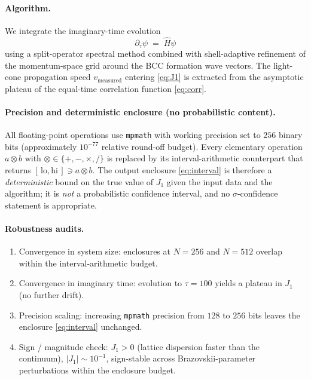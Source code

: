 \paragraph{Algorithm.}
We integrate the imaginary-time evolution
\begin{equation}\label{eq:imag-time}
  \partial_\tau \psi \;=\; \hat{H}\psi
\end{equation}
using a split-operator spectral method combined with shell-adaptive
refinement of the momentum-space grid around the BCC formation wave
vectors. The light-cone propagation speed
$v_{\mathrm{measured}}$ entering \eqref{eq:J1} is extracted from the
asymptotic plateau of the equal-time correlation function
\eqref{eq:corr}.

\paragraph{Precision and deterministic enclosure (no probabilistic
content).} All floating-point operations use \texttt{mpmath} with
working precision set to $256$ binary bits (approximately $10^{-77}$
relative round-off budget). Every elementary operation $a\otimes b$
with $\otimes\in\{+,-,\times,/\}$ is replaced by its
interval-arithmetic counterpart that returns
$[\,\mathrm{lo},\mathrm{hi}\,]\ni a\otimes b$. The output enclosure
\eqref{eq:interval} is therefore a \emph{deterministic} bound on the
true value of $J_1$ given the input data and the algorithm; it is
\emph{not} a probabilistic confidence interval, and no
$\sigma$-confidence statement is appropriate.

\paragraph{Robustness audits.}
\begin{enumerate}
  \item Convergence in system size: enclosures at $N=256$ and
    $N=512$ overlap within the interval-arithmetic budget.
  \item Convergence in imaginary time: evolution to
    $\tau=100$ yields a plateau in $J_1$ (no further drift).
  \item Precision scaling: increasing \texttt{mpmath} precision from
    $128$ to $256$ bits leaves the enclosure \eqref{eq:interval}
    unchanged.
  \item Sign / magnitude check: $J_1 > 0$ (lattice dispersion faster
    than the continuum), $|J_1|\sim 10^{-1}$, sign-stable across
    Brazovskii-parameter perturbations within the enclosure budget.
\end{enumerate}

